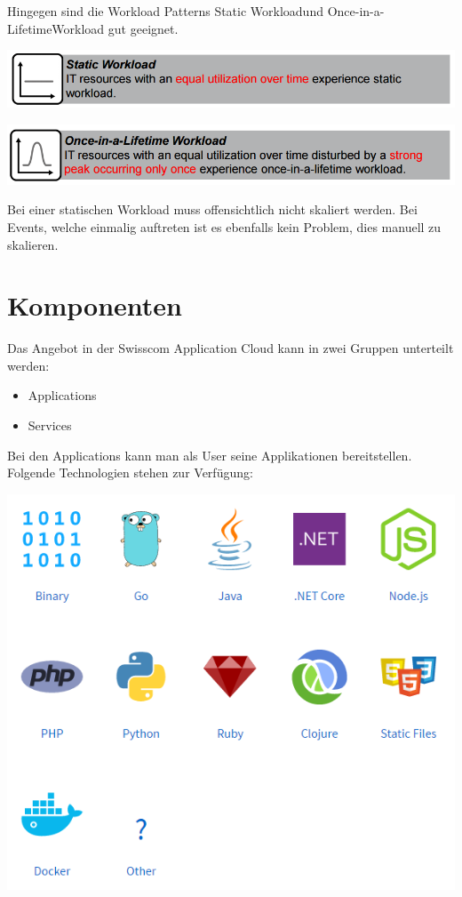 Hingegen sind die Workload Patterns \glqq Static Workload\grqq und \glqq Once-in-a-Lifetime\grqq Workload gut geeignet.

\includegraphics[scale=0.6]{images/static-workload.png}

\includegraphics[scale=0.6]{images/once-lifetime.png}

Bei einer statischen Workload muss offensichtlich nicht skaliert werden. Bei Events, welche einmalig auftreten ist es ebenfalls kein Problem, dies manuell zu skalieren.

\section{Komponenten}
Das Angebot in der Swisscom Application Cloud kann in zwei Gruppen unterteilt werden:
\begin{itemize}
\item Applications
\item Services
\end{itemize}

Bei den Applications kann man als User seine Applikationen bereitstellen. Folgende Technologien stehen zur Verfügung:

\includegraphics[scale=0.7]{images/applications.png}


